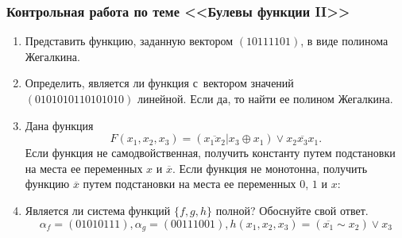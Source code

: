 \documentclass{rpd}
\begin{document}
    \subsubsection*{Контрольная работа по теме <<Булевы функции II>>}

        \begin{enumerate}
        \item
        Представить функцию, заданную вектором $(10111101)$, в виде полинома Жегалкина.
        \item
        Определить, является ли функция с~вектором значений~$(0101010110101010)$ линейной. Если да, то найти ее полином Жегалкина.
        \item
        Дана функция 
        \[
        F(x_1,x_2,x_3) = (\overline{x_1x_2}|x_3\oplus x_1)\vee \overline{x_2x_3x_1}.
        \]
        Если функция не самодвойственная, получить константу путем подстановки на места ее переменных $x$ и $\overline{x}$. Если функция не монотонна, получить функцию $\overline{x}$ путем подстановки на места ее переменных $0$, $1$ и $x$:
        \item 
        Является ли система функций $\{f,g,h\}$ полной? Обоснуйте свой ответ.
        \[
            \alpha_f=(01010111), \alpha_g = (00111001), h(x_1,x_2,x_3) = (\overline{x_1}\sim x_2)\vee x_3
        \]
        \end{enumerate}
        
\end{document}

